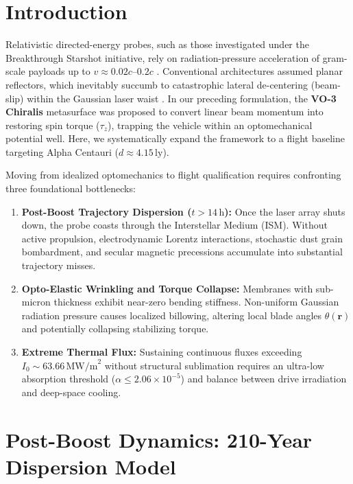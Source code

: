 \documentclass[11pt, a4paper]{article}
\begin{document}
\section{Introduction}

Relativistic directed-energy probes, such as those investigated under the Breakthrough Starshot initiative, rely on radiation-pressure acceleration of gram-scale payloads up to $v \approx 0.02c$--$0.2c$ \cite{lubin2016}. Conventional architectures assumed planar reflectors, which inevitably succumb to catastrophic lateral de-centering (beam-slip) within the Gaussian laser waist \cite{manchester2017}. In our preceding formulation, the \textbf{VO-3 Chiralis} metasurface was proposed to convert linear beam momentum into restoring spin torque ($\tau_z$), trapping the vehicle within an optomechanical potential well. Here, we systematically expand the framework to a flight baseline targeting Alpha Centauri ($d \approx 4.15\,\text{ly}$).

Moving from idealized optomechanics to flight qualification requires confronting three foundational bottlenecks:
\begin{enumerate}
    \item \textbf{Post-Boost Trajectory Dispersion ($t > 14\,\text{h}$):} Once the laser array shuts down, the probe coasts through the Interstellar Medium (ISM). Without active propulsion, electrodynamic Lorentz interactions, stochastic dust grain bombardment, and secular magnetic precessions accumulate into substantial trajectory misses.
    \item \textbf{Opto-Elastic Wrinkling and Torque Collapse:} Membranes with sub-micron thickness exhibit near-zero bending stiffness. Non-uniform Gaussian radiation pressure causes localized billowing, altering local blade angles $\theta(\mathbf{r})$ and potentially collapsing stabilizing torque.
    \item \textbf{Extreme Thermal Flux:} Sustaining continuous fluxes exceeding $I_0 \sim 63.66\,\text{MW/m}^2$ without structural sublimation requires an ultra-low absorption threshold ($\alpha \le 2.06 \times 10^{-5}$) and balance between drive irradiation and deep-space cooling.
\end{enumerate}

\section{Post-Boost Dynamics: 210-Year Dispersion Model}
\end{document}
